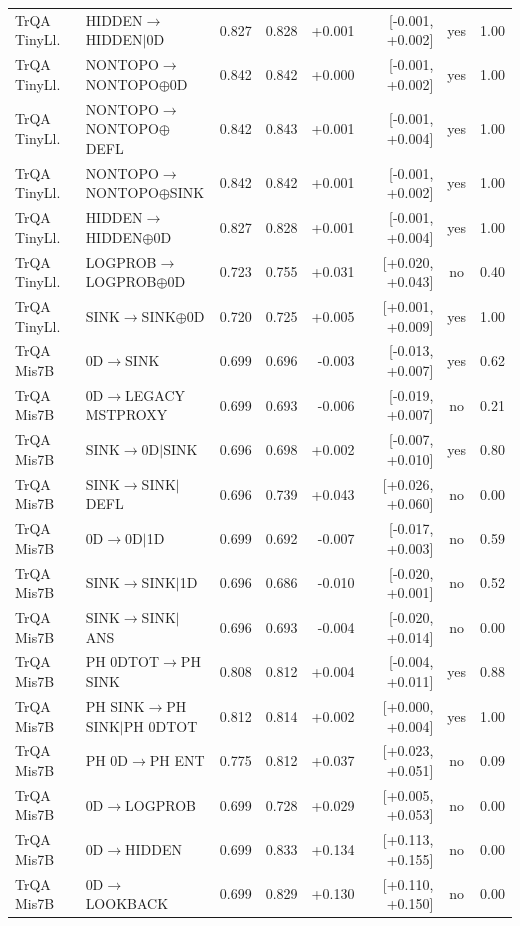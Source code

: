 \begin{longtable}{llrrrrcc}
TrQA TinyLl. & HIDDEN$\to$HIDDEN$\mid$0D & 0.827 & 0.828 & +0.001 & [-0.001, +0.002] & yes & 1.00 \\
TrQA TinyLl. & NONTOPO$\to$NONTOPO$\oplus$0D & 0.842 & 0.842 & +0.000 & [-0.001, +0.002] & yes & 1.00 \\
TrQA TinyLl. & NONTOPO$\to$NONTOPO$\oplus$DEFL & 0.842 & 0.843 & +0.001 & [-0.001, +0.004] & yes & 1.00 \\
TrQA TinyLl. & NONTOPO$\to$NONTOPO$\oplus$SINK & 0.842 & 0.842 & +0.001 & [-0.001, +0.002] & yes & 1.00 \\
TrQA TinyLl. & HIDDEN$\to$HIDDEN$\oplus$0D & 0.827 & 0.828 & +0.001 & [-0.001, +0.004] & yes & 1.00 \\
TrQA TinyLl. & LOGPROB$\to$LOGPROB$\oplus$0D & 0.723 & 0.755 & +0.031 & [+0.020, +0.043] & no & 0.40 \\
TrQA TinyLl. & SINK$\to$SINK$\oplus$0D & 0.720 & 0.725 & +0.005 & [+0.001, +0.009] & yes & 1.00 \\
TrQA Mis7B & 0D$\to$SINK & 0.699 & 0.696 & -0.003 & [-0.013, +0.007] & yes & 0.62 \\
TrQA Mis7B & 0D$\to$LEGACY MSTPROXY & 0.699 & 0.693 & -0.006 & [-0.019, +0.007] & no & 0.21 \\
TrQA Mis7B & SINK$\to$0D$\mid$SINK & 0.696 & 0.698 & +0.002 & [-0.007, +0.010] & yes & 0.80 \\
TrQA Mis7B & SINK$\to$SINK$\mid$DEFL & 0.696 & 0.739 & +0.043 & [+0.026, +0.060] & no & 0.00 \\
TrQA Mis7B & 0D$\to$0D$\mid$1D & 0.699 & 0.692 & -0.007 & [-0.017, +0.003] & no & 0.59 \\
TrQA Mis7B & SINK$\to$SINK$\mid$1D & 0.696 & 0.686 & -0.010 & [-0.020, +0.001] & no & 0.52 \\
TrQA Mis7B & SINK$\to$SINK$\mid$ANS & 0.696 & 0.693 & -0.004 & [-0.020, +0.014] & no & 0.00 \\
TrQA Mis7B & PH 0DTOT$\to$PH SINK & 0.808 & 0.812 & +0.004 & [-0.004, +0.011] & yes & 0.88 \\
TrQA Mis7B & PH SINK$\to$PH SINK$\mid$PH 0DTOT & 0.812 & 0.814 & +0.002 & [+0.000, +0.004] & yes & 1.00 \\
TrQA Mis7B & PH 0D$\to$PH ENT & 0.775 & 0.812 & +0.037 & [+0.023, +0.051] & no & 0.09 \\
TrQA Mis7B & 0D$\to$LOGPROB & 0.699 & 0.728 & +0.029 & [+0.005, +0.053] & no & 0.00 \\
TrQA Mis7B & 0D$\to$HIDDEN & 0.699 & 0.833 & +0.134 & [+0.113, +0.155] & no & 0.00 \\
TrQA Mis7B & 0D$\to$LOOKBACK & 0.699 & 0.829 & +0.130 & [+0.110, +0.150] & no & 0.00 \\

\end{longtable}
